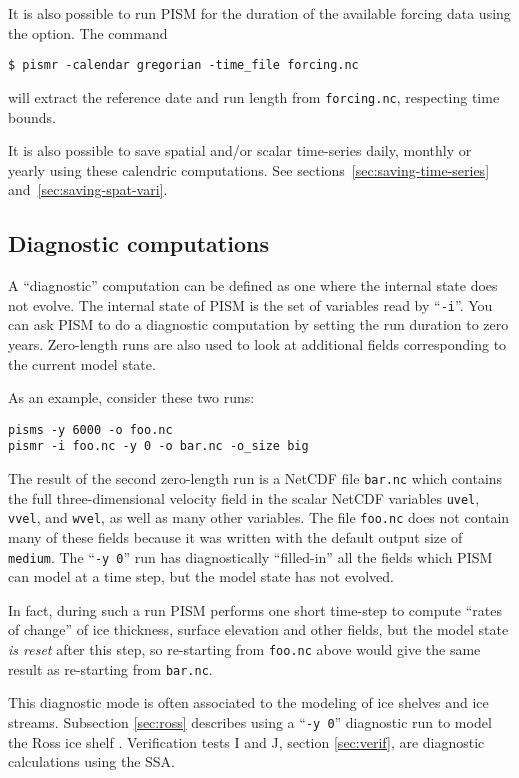 It is also possible to run PISM for the duration of the available forcing data using the  option.  The command
\begin{verbatim}
$ pismr -calendar gregorian -time_file forcing.nc
\end{verbatim}
will extract the reference date and run length from \texttt{forcing.nc}, respecting time bounds.

It is also possible to save spatial and/or scalar time-series daily, monthly or yearly using these calendric computations. See sections~\ref{sec:saving-time-series} and~\ref{sec:saving-spat-vari}.


\subsection{Diagnostic computations}
\label{sec:diagnostic-computations}

A ``diagnostic'' computation can be defined as one where the internal state does not evolve.  The internal state of PISM is the set of variables read by ``\texttt{-i}''.  You can ask PISM to do a diagnostic computation by setting the run duration to zero years.  Zero-length runs are also used to look at additional fields corresponding to the current model state.

As an example, consider these two runs:
\begin{verbatim}
pisms -y 6000 -o foo.nc
pismr -i foo.nc -y 0 -o bar.nc -o_size big
\end{verbatim}

\noindent The result of the second zero-length run is a NetCDF file \texttt{bar.nc} which contains the full three-dimensional velocity field in the scalar NetCDF variables \texttt{uvel}, \texttt{vvel}, and \texttt{wvel}, as well as many other variables.  The file \texttt{foo.nc} does not contain many of these fields because it was written with the default output size of \texttt{medium}.  The ``\texttt{-y 0}'' run has diagnostically ``filled-in'' all the fields which PISM can model at a time step, but the model state has not evolved.

In fact, during such a run PISM performs one short time-step to compute ``rates of change'' of ice thickness, surface elevation and other fields, but the model state \emph{is reset} after this step, so re-starting from \texttt{foo.nc} above would give the same result as re-starting from \texttt{bar.nc}.

This diagnostic mode is often associated to the modeling of ice shelves and ice streams.  Subsection \ref{sec:ross} describes using a ``\texttt{-y 0}'' diagnostic run to model the Ross ice shelf \cite{MacAyealetal}.  Verification tests I and J, section \ref{sec:verif}, are diagnostic calculations using the SSA.

